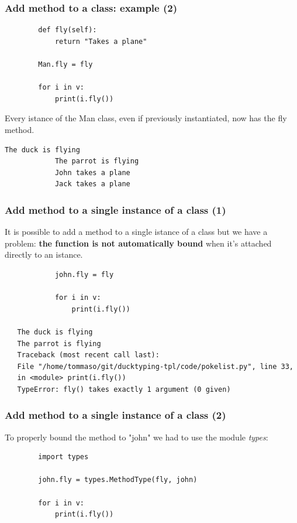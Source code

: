 \documentclass[xcolor ={table,usenames,dvipsnames}]{beamer}
\theoremstyle{definition}
\begin{document}
	\begin{frame}[fragile]
		\frametitle{Add method to a class: example (2)}
		\begin{lstlisting}
		def fly(self):
			return "Takes a plane"
		
		Man.fly = fly
		
		for i in v:
			print(i.fly())
		\end{lstlisting}
		Every istance of the Man class, even if previously instantiated, now has the fly method.
		\begin{lstlisting}[basicstyle=\fontsize{2}{4}\selectfont\ttfamily\tiny,keywordstyle=\color{black},
		commentstyle=\color{black},
		stringstyle=\color{black}.]	
			The duck is flying
			The parrot is flying
			John takes a plane
			Jack takes a plane
		\end{lstlisting}
	\end{frame}

	\begin{frame}[fragile]
		\frametitle{Add method to a single instance of a class (1)}
			It is possible to add a method to a single istance of a class but we have a problem: \textbf{the function is not automatically bound} when it's attached directly to an istance.
			
				\begin{lstlisting}
			john.fly = fly
			
			for i in v:
				print(i.fly())
				
   The duck is flying
   The parrot is flying
   Traceback (most recent call last):
   File "/home/tommaso/git/ducktyping-tpl/code/pokelist.py", line 33, 
   in <module> print(i.fly())
   TypeError: fly() takes exactly 1 argument (0 given)
			\end{lstlisting}
	\end{frame}
	
	\begin{frame}[fragile]
		\frametitle{Add method to a single instance of a class (2)}
			
		To properly bound the method  to "john" we had to use the module \textit{types}:
		
		\begin{lstlisting}
		import types
		
		john.fly = types.MethodType(fly, john)
		
		for i in v:
			print(i.fly())
		\end{lstlisting}
	\end{frame}
\end{document}
